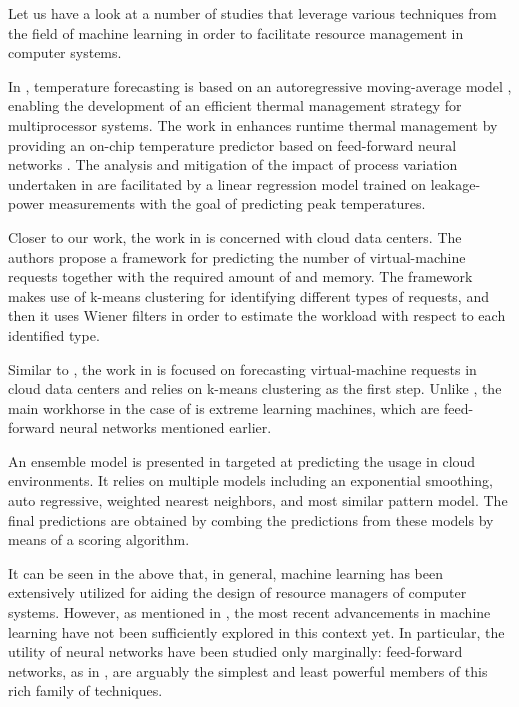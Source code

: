 Let us have a look at a number of studies that leverage various techniques from
the field of machine learning in order to facilitate resource management in
computer systems.

In \cite{coskun2008}, temperature forecasting is based on an autoregressive
moving-average model \cite{hastie2009}, enabling the development of an efficient
thermal management strategy for multiprocessor systems. The work in
\cite{kumar2010} enhances runtime thermal management by providing an on-chip
temperature predictor based on feed-forward neural networks \cite{hastie2009}.
The analysis and mitigation of the impact of process variation undertaken in
\cite{juan2014} are facilitated by a linear regression model \cite{hastie2009}
trained on leakage-power measurements with the goal of predicting peak
temperatures.

Closer to our work, the work in \cite{dabbagh2015} is concerned with cloud data
centers. The authors propose a framework for predicting the number of
virtual-machine requests together with the required amount of  and
memory. The framework makes use of k-means clustering \cite{hastie2009} for
identifying different types of requests, and then it uses Wiener filters in
order to estimate the workload with respect to each identified type.

Similar to \cite{dabbagh2015}, the work in \cite{ismaeel2015} is focused on
forecasting virtual-machine requests in cloud data centers and relies on k-means
clustering as the first step. Unlike \cite{dabbagh2015}, the main workhorse in
the case of \cite{ismaeel2015} is extreme learning machines, which are
feed-forward neural networks mentioned earlier.

An ensemble model \cite{hastie2009} is presented in \cite{cao2014} targeted at
predicting the  usage in cloud environments. It relies on multiple
models including an exponential smoothing, auto regressive, weighted nearest
neighbors, and most similar pattern model. The final predictions are obtained by
combing the predictions from these models by means of a scoring algorithm.

It can be seen in the above that, in general, machine learning has been
extensively utilized for aiding the design of resource managers of computer
systems. However, as mentioned in , the most recent
advancements in machine learning have not been sufficiently explored in this
context yet. In particular, the utility of neural networks have been studied
only marginally: feed-forward networks, as in \cite{kumar2010, ismaeel2015}, are
arguably the simplest and least powerful members of this rich family of
techniques.

